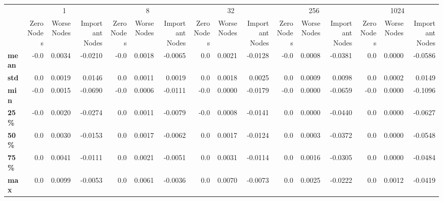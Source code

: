 \begin{tabular}{lrrrrrrrrrrrrrrr}
\toprule
{} & \multicolumn{3}{c}{1} & \multicolumn{3}{c}{8} & \multicolumn{3}{c}{32} & \multicolumn{3}{c}{256} & \multicolumn{3}{c}{1024} \\
{} & Zero Nodes & Worse Nodes & Important Nodes & Zero Nodes & Worse Nodes & Important Nodes & Zero Nodes & Worse Nodes & Important Nodes & Zero Nodes & Worse Nodes & Important Nodes & Zero Nodes & Worse Nodes & Important Nodes \\
\midrule
\textbf{mean} &       -0.0 &      0.0034 &         -0.0210 &       -0.0 &      0.0018 &         -0.0065 &        0.0 &      0.0021 &         -0.0128 &       -0.0 &      0.0008 &         -0.0381 &        0.0 &      0.0000 &         -0.0586 \\
\textbf{std } &        0.0 &      0.0019 &          0.0146 &        0.0 &      0.0011 &          0.0019 &        0.0 &      0.0018 &          0.0025 &        0.0 &      0.0009 &          0.0098 &        0.0 &      0.0002 &          0.0149 \\
\textbf{min } &       -0.0 &      0.0015 &         -0.0690 &       -0.0 &      0.0006 &         -0.0111 &       -0.0 &      0.0000 &         -0.0179 &       -0.0 &      0.0000 &         -0.0659 &       -0.0 &      0.0000 &         -0.1096 \\
\textbf{25\% } &       -0.0 &      0.0020 &         -0.0274 &        0.0 &      0.0011 &         -0.0079 &       -0.0 &      0.0008 &         -0.0141 &        0.0 &      0.0000 &         -0.0440 &        0.0 &      0.0000 &         -0.0627 \\
\textbf{50\% } &        0.0 &      0.0030 &         -0.0153 &        0.0 &      0.0017 &         -0.0062 &        0.0 &      0.0017 &         -0.0124 &        0.0 &      0.0003 &         -0.0372 &        0.0 &      0.0000 &         -0.0548 \\
\textbf{75\% } &        0.0 &      0.0041 &         -0.0111 &        0.0 &      0.0021 &         -0.0051 &        0.0 &      0.0031 &         -0.0114 &        0.0 &      0.0016 &         -0.0305 &        0.0 &      0.0000 &         -0.0484 \\
\textbf{max } &        0.0 &      0.0099 &         -0.0053 &        0.0 &      0.0061 &         -0.0036 &        0.0 &      0.0070 &         -0.0073 &        0.0 &      0.0025 &         -0.0222 &        0.0 &      0.0012 &         -0.0419 \\
\bottomrule
\end{tabular}

